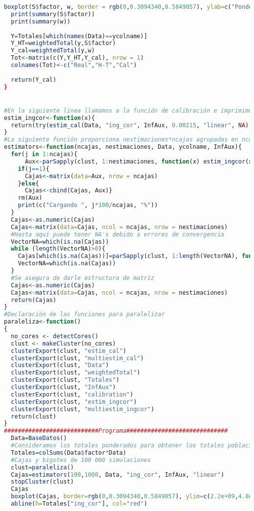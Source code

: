 \documentclass[a4paper,twoside,openright,12pt]{book}
\theoremstyle{definition}
\numberwithin{equation}{chapter}
\numberwithin{figure}{chapter}
\numberwithin{table}{chapter}
\numberwithin{theorem}{chapter}
\numberwithin{lemma}{chapter}
\begin{document}
\begin{lstlisting}[language=R]
  boxplot(S$factor, w, border = rgb(0,0.3094340,0.5849057), ylab=c("Ponderadores"), names=c("Iniciales","Calibrados"))
  print(summary(S$factor))
  print(summary(w))
  
  Y=Totales[which(names(Data)==ycolname)]
  Y_HT=weightedTotal(y,S$factor)
  Y_cal=weightedTotal(y,w)
  Tot<-matrix(c(Y,Y_HT,Y_cal), nrow = 1)
  colnames(Tot)<-c("Real","H-T","Cal")
  
  return(Y_cal)
}


#En la siguiente linea llamamos a la función de calibración e imprimimos los resultados de los totales, el método de calibración mtd puede ser linear, logit, truncated o raking
estim_ingcor<-function(x){
  return(try(estim_cal(Data, "ing_cor", InfAux, 0.00215, "linear", NA),TRUE))
}
#La siguiente función proporciona nestimaciones*ncajas agrupadas en ncajas conjuntos
estimators<-function(ncajas, nestimaciones, Data, ycolname, InfAux){
  for(j in 1:ncajas){
      Aux<-parSapply(clust, 1:nestimaciones, function(x) estim_ingcor(x))
    if(j==1){
      Cajas<-matrix(data=Aux, nrow = ncajas)
    }else{
      Cajas<-cbind(Cajas, Aux)}
    rm(Aux)
    print(c("Cargando ", j*100/ncajas, "%"))
  }
  Cajas<-as.numeric(Cajas)
  Cajas<-matrix(data=Cajas, ncol = ncajas, nrow = nestimaciones)
  #Hasta aquí puede tener NA's debido a errores de convergencia
  VectorNA=which(is.na(Cajas))
  while (length(VectorNA)>0){
    Cajas[which(is.na(Cajas))]=parSapply(clust, 1:length(VectorNA), function(x) estim_ingcor(x))#Llena los na's
    VectorNA=which(is.na(Cajas))
  }
  #Se asegura de darle estructura de matriz
  Cajas<-as.numeric(Cajas)
  Cajas<-matrix(data=Cajas, ncol = ncajas, nrow = nestimaciones)
  return(Cajas)
}
#Declaración de las funciones para paralelizar
paraleliza<-function()
{
  no_cores <- detectCores()
  clust <- makeCluster(no_cores)
  clusterExport(clust, "estim_cal")
  clusterExport(clust, "multiestim_cal")
  clusterExport(clust, "Data")
  clusterExport(clust, "weightedTotal")
  clusterExport(clust, "Totales")
  clusterExport(clust, "InfAux")
  clusterExport(clust, "calibration")
  clusterExport(clust, "estim_ingcor")
  clusterExport(clust, "multiestim_ingcor")
  return(clust)
}
###########################Programa#############################
  Data=BaseDatos()
  #Consideramos los totales ponderados para obtener los totales poblacionales, pues tales factores se obtuvieron para el muestreo con probabilidad proporcional al tamaño en la población entera.
  Totales=colSums(Data$factor*Data)
  #Cajas y bigotes de 100 000 simulaciones
  clust=paraleliza()
  Cajas=estimators(100,1000, Data, "ing_cor", InfAux, "linear")
  stopCluster(clust)
  Cajas
  boxplot(Cajas, border=rgb(0,0.3094340,0.5849057), ylim=c(2.2e+09,4.8e+09), ylab="Total estimado", xlab="Realizaciones")
  abline(h=Totales["ing_cor"], col="red")
\end{lstlisting}%
\end{document}
